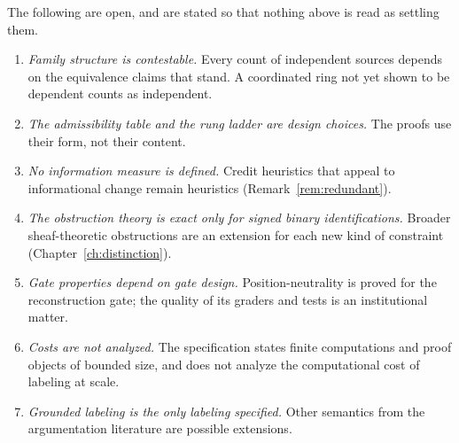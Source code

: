 The following are open, and are stated so that nothing above is read as settling them.
\begin{enumerate}
\item \emph{Family structure is contestable.} Every count of independent sources depends on the equivalence claims that stand. A coordinated ring not yet shown to be dependent counts as independent.
\item \emph{The admissibility table and the rung ladder are design choices.} The proofs use their form, not their content.
\item \emph{No information measure is defined.} Credit heuristics that appeal to informational change remain heuristics (Remark~\ref{rem:redundant}).
\item \emph{The obstruction theory is exact only for signed binary identifications.} Broader sheaf-theoretic obstructions are an extension for each new kind of constraint (Chapter~\ref{ch:distinction}).
\item \emph{Gate properties depend on gate design.} Position-neutrality is proved for the reconstruction gate; the quality of its graders and tests is an institutional matter.
\item \emph{Costs are not analyzed.} The specification states finite computations and proof objects of bounded size, and does not analyze the computational cost of labeling at scale.
\item \emph{Grounded labeling is the only labeling specified.} Other semantics from the argumentation literature are possible extensions.
\end{enumerate}

